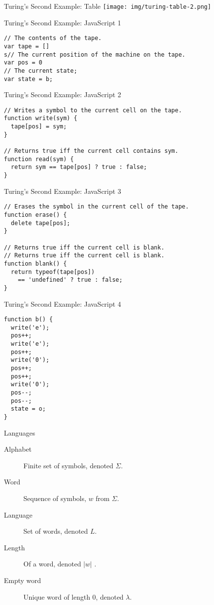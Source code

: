 \begin{frame}{Turing's Second Example: Table}
  \texttt{[image: img/turing-table-2.png]}
\end{frame}

\begin{frame}[fragile]{Turing's Second Example: JavaScript 1}
\begin{verbatim}
// The contents of the tape.
var tape = []
s// The current position of the machine on the tape.
var pos = 0
// The current state;
var state = b;
\end{verbatim}
\end{frame}

\begin{frame}[fragile]{Turing's Second Example: JavaScript 2}
\begin{verbatim}
// Writes a symbol to the current cell on the tape.
function write(sym) {
  tape[pos] = sym;
}

// Returns true iff the current cell contains sym.
function read(sym) {
  return sym == tape[pos] ? true : false;
}
\end{verbatim}
\end{frame}

\begin{frame}[fragile]{Turing's Second Example: JavaScript 3}
\begin{verbatim}
// Erases the symbol in the current cell of the tape.
function erase() {
  delete tape[pos];
}

// Returns true iff the current cell is blank.
// Returns true iff the current cell is blank.
function blank() {
  return typeof(tape[pos])
    == 'undefined' ? true : false;
}
\end{verbatim}
\end{frame}

\begin{frame}[fragile]{Turing's Second Example: JavaScript 4}
\begin{verbatim}
function b() {
  write('e');
  pos++;
  write('e');
  pos++;
  write('0');
  pos++;
  pos++;
  write('0');
  pos--;
  pos--;
  state = o;
}
\end{verbatim}
\end{frame}

\begin{frame}{Languages}
  \begin{description}
    \item[Alphabet] Finite set of symbols, denoted $\Sigma$.
    \item[Word] Sequence of symbols, $w$ from $\Sigma$.
    \item[Language] Set of words, denoted $L$.
    \item[Length] Of a word, denoted $|w|$  .
    \item[Empty word] Unique word of length 0, denoted $\lambda$.
  \end{description}
\end{frame}

